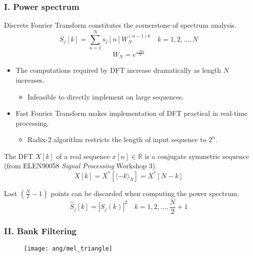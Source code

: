 
\begin{frame}
\frametitle{I. Power spectrum}

Discrete Fourier Transform constitutes the cornerstone of spectrum analysis.
\begin{equation}
S_j[k] = \sum_{n=1}^{N} s_j[n] W_N^{(n-1) k} \quad k = 1, 2, \dots, N
\end{equation}
\begin{equation}
W_N = e^{\frac{- 2\pi i}{N}}
\end{equation}

\begin{itemize}
	\item The computations required by DFT increase dramatically as length $N$ increases.
	\begin{itemize}
		\item Infeasible to directly implement on large sequences.
	\end{itemize}
	\item Fast Fourier Transform makes implementation of DFT practical in real-time processing.
	\begin{itemize}
		\item Radix-2 algorithm restricts the length of input sequence to $2^n$.
	\end{itemize}
\end{itemize}
\end{frame}


\begin{frame}
The DFT $X[k]$ of a real sequence $x[n] \in \mathbb{R}$ is a conjugate symmetric sequence (from ELEN90058 \textit{Signal Processing} Workshop 3).
\begin{equation}
X[k] = X^*[\langle-k\rangle_{N}] = X^*[N-k]
\end{equation}

Last $(\frac{N}{2} - 1)$ points can be discarded when computing the power spectrum.
\begin{equation}
\hat{S}_j[k] = |S_j(k)|^2 \quad k = 1, 2, \dots, \frac{N}{2} + 1
\end{equation}
\end{frame}


\begin{frame}
\frametitle{II. Bank Filtering}
\begin{figure}[H]
\centering
\texttt{[image: ang/mel\_triangle]}
\end{figure}
\end{frame}

